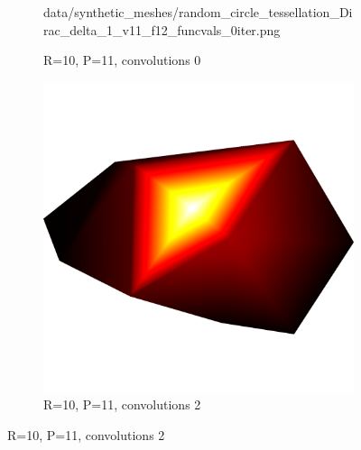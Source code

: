 \begin{figure}[ht]
\begin{subfigure}[b]{0.32\linewidth}
		{data/synthetic_meshes/random_circle_tessellation_Dirac_delta_1_v11_f12_funcvals_0iter.png}
		\caption{R=10, P=11, convolutions 0}\label{fig:rcirc.c}
	\end{subfigure}
	\begin{subfigure}[b]{0.32\linewidth}
		\includegraphics[width=\linewidth,]
		{data/synthetic_meshes/random_circle_tessellation_Dirac_delta_1_v11_f12_funcvals_2iter.png}
		\caption{R=10, P=11, convolutions 2}\label{fig:rcirc.e}
	\end{subfigure}


\end{figure}
